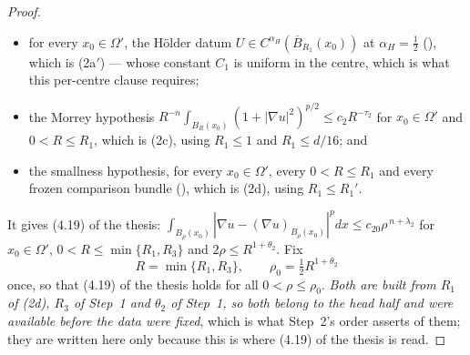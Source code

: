 \begin{proof}
\begin{itemize}
  (), which is (2b);
\item for every $x_0\in\Omega'$, the H\"older datum
  $U\in C^{\alpha_H}(\overline B_{R_1}(x_0))$ at $\alpha_H=\tfrac12$
  (), which is (2a$'$) --- whose constant $C_1$ is uniform
  in the centre, which is what this per-centre clause requires;
\item the Morrey hypothesis
  $R^{-n}\int_{B_R(x_0)}(1+|\nabla u|^2)^{p/2}\le c_2R^{-\tau_2}$ for
  $x_0\in\Omega'$ and $0<R\le R_1$, which is (2c), using $R_1\le1$ and
  $R_1\le d/16$; and
\item the smallness hypothesis, for every $x_0\in\Omega'$, every
  $0<R\le R_1$ and every frozen comparison bundle
  (), which is (2d), using $R_1\le R_1'$.
\end{itemize}
It gives (4.19) of the thesis: $\int_{B_\rho(x_0)}|\nabla u-(\nabla u)_{B_\rho(x_0)}|^pdx\le
c_{20}\rho^{\,n+\lambda_2}$ for $x_0\in\Omega'$, $0<R\le\min\{R_1,R_3\}$ and
$2\rho\le R^{1+\theta_2}$.  Fix
\[
R=\min\{R_1,R_3\},\qquad \rho_0=\tfrac12R^{1+\theta_2}
\]
once, so that (4.19) of the thesis holds for all $0<\rho\le\rho_0$.  \emph{Both are
built from $R_1$ of \textup{(2d)}, $R_3$ of Step~1 and $\theta_2$ of Step~1, so
both belong to the head half and were available before the data were fixed},
which is what Step~2's order asserts of them; they are written here only
because this is where (4.19) of the thesis is read.


\end{proof}
